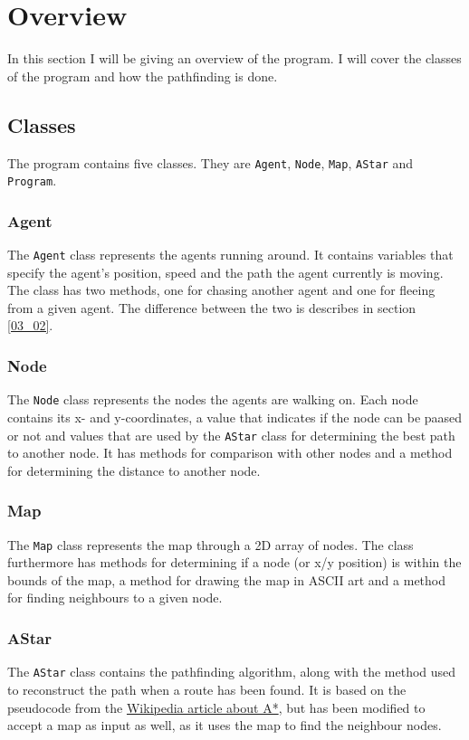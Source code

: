 \section{Overview}
\label{03}

In this section I will be giving an overview of the program. I will cover the classes of the program and how the pathfinding is done.

\subsection{Classes}
\label{03_01}

The program contains five classes. They are \texttt{Agent}, \texttt{Node}, \texttt{Map}, \texttt{AStar} and \texttt{Program}.

\subsubsection{Agent}
\label{03_01_01}
The \texttt{Agent} class represents the agents running around. It contains variables that specify the agent's position, speed and the path the agent currently is moving. The class has two methods, one for chasing another agent and one for fleeing from a given agent. The difference between the two is describes in section \ref{03_02}.

\subsubsection{Node}
\label{03_01_02}
The \texttt{Node} class represents the nodes the agents are walking on. Each node contains its x- and y-coordinates, a value that indicates if the node can be paased or not and values that are used by the \texttt{AStar} class for determining the best path to another node. It has methods for comparison with other nodes and a method for determining the distance to another node.

\subsubsection{Map}
\label{03_01_03}
The \texttt{Map} class represents the map through a 2D array of nodes. The class furthermore has methods for determining if a node (or x/y position) is within the bounds of the map, a method for drawing the map in ASCII art and a method for finding neighbours to a given node.

\subsubsection{AStar}
\label{03_01_04}
The \texttt{AStar} class contains the pathfinding algorithm, along with the method used to reconstruct the path when a route has been found. It is based on the pseudocode from the \href{http://en.wikipedia.org/wiki/A*_search_algorithm#Pseudocode}{Wikipedia article about A*}, but has been modified to accept a map as input as well, as it uses the map to find the neighbour nodes.

